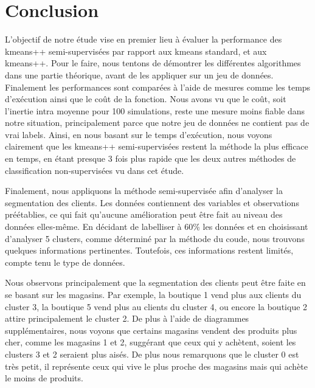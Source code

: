 \documentclass[12pt,a4paper]{book}
\newcommand{\1}{\mathds{1}}
\begin{document}
\vspace{10 mm}

\section{Conclusion}


\vspace{10 mm}

\noindent
L'objectif de notre étude vise en premier lieu à évaluer la performance des kmeans++ semi-supervisées par rapport aux kmeans standard, et aux kmeans++. Pour le faire, nous tentons de démontrer les différentes algorithmes dans une partie théorique, avant de les appliquer sur un jeu de données. Finalement les performances sont comparées à l'aide de mesures comme les temps d'exécution ainsi que le coût de la fonction. Nous avons vu que le coût, soit l'inertie intra moyenne pour 100 simulations, reste une mesure moins fiable dans notre situation, principalement parce que notre jeu de données ne contient pas de vrai labels. Ainsi, en nous basant sur le temps d'exécution, nous voyons clairement que les kmeans++ semi-supervisées restent la méthode la plus efficace en temps, en étant presque 3 fois plus rapide que les deux autres méthodes de classification non-supervisées vu dans cet étude.

Finalement, nous appliquons la méthode semi-supervisée afin d'analyser la segmentation des clients. Les données contiennent des variables et observations préétablies, ce qui fait qu'aucune amélioration peut être fait au niveau des données elles-même. En décidant de labelliser à 60\% les données et en choisissant d'analyser 5 clusters, comme déterminé par la méthode du coude, nous trouvons quelques informations pertinentes. Toutefois, ces informations restent limités, compte tenu le type de données.

Nous observons principalement que la segmentation des clients peut être faite en se basant sur les magasins. Par exemple, la boutique 1 vend plus aux clients du cluster 3, la boutique 5 vend plus au clients du cluster 4, ou encore la boutique 2 attire principalement le cluster 2. De plus à l'aide de diagrammes supplémentaires, nous voyons que certains magasins vendent des produits plus cher, comme les magasins 1 et 2, suggérant que ceux qui y achètent, soient les clusters 3 et 2 seraient plus aisés. De plus nous remarquons que le cluster 0 est très petit, il représente ceux qui vive le plus proche des magasins mais qui achète le moins de produits.
\end{document}
